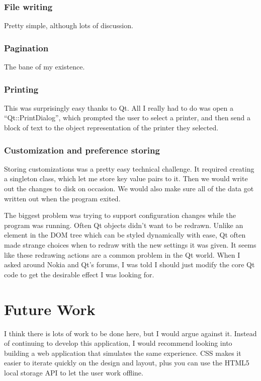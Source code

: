 \documentclass[10pt]{article}
\begin{document}
\subsubsection{File writing}

Pretty simple, although lots of discussion.

\subsubsection{Pagination}

The bane of my existence.

\subsubsection{Printing}

This was surprisingly easy thanks to Qt. All I really had to do was open a ``Qt::PrintDialog'', which prompted the user to select a printer, and then send a block of text to the object representation of the printer they selected.

\subsubsection{Customization and preference storing}

Storing customizations was a pretty easy technical challenge. It required creating a singleton class, which let me store key value pairs to it. Then we would write out the changes to disk on occasion. We would also make sure all of the data got written out when the program exited.

The biggest problem was trying to support configuration changes while the program was running. Often Qt objects didn't want to be redrawn. Unlike an element in the DOM tree which can be styled dynamically with ease, Qt often made strange choices when to redraw with the new settings it was given. It seems like these redrawing actions are a common problem in the Qt world. When I asked around Nokia and Qt's forums, I was told I should just modify the core Qt code to get the desirable effect I was looking for.

\section{Future Work}

I think there is lots of work to be done here, but I would argue against it. Instead of continuing to develop this application, I would recommend looking into building a web application that simulates the same experience. CSS makes it easier to iterate quickly on the design and layout, plus you can use the HTML5 local storage API to let the user work offline.
\end{document}
